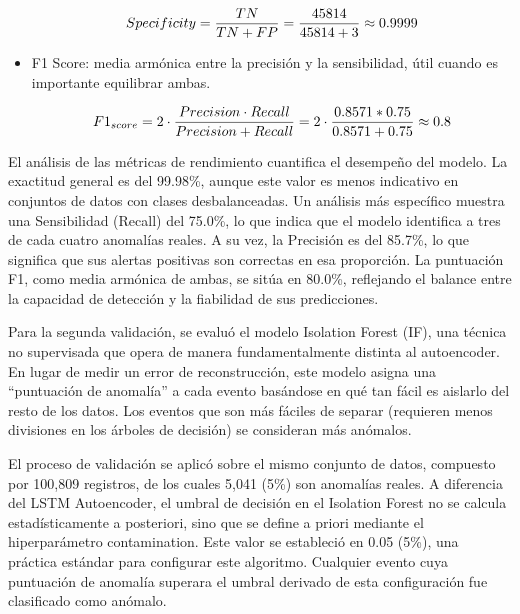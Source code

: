 \begin{itemize}
            \begin{align}
                  Specificity = \frac{TN}{TN+FP}=\frac{45814}{45814+3}\approx 0.9999 \notag \\
                  \label{eq:specificity}
            \end{align}

      \item F1 Score: media armónica entre la precisión y la sensibilidad, útil cuando es importante equilibrar ambas.

            \begin{align}
                  F1_{score} = 2 \cdot \frac{Precision \cdot Recall}{Precision + Recall} = 2 \cdot \frac{0.8571 * 0.75}{0.8571+0.75} \approx 0.8 \notag \\
                  \label{eq:f1score}
            \end{align}

\end{itemize}

El análisis de las métricas de rendimiento cuantifica el desempeño del modelo. La exactitud general es del 99.98\%, aunque este valor es menos indicativo en conjuntos de datos con clases desbalanceadas. Un análisis más específico muestra una Sensibilidad (Recall) del 75.0\%, lo que indica que el modelo identifica a tres de cada cuatro anomalías reales. A su vez, la Precisión es del 85.7\%, lo que significa que sus alertas positivas son correctas en esa proporción. La puntuación F1, como media armónica de ambas, se sitúa en 80.0\%, reflejando el balance entre la capacidad de detección y la fiabilidad de sus predicciones.


Para la segunda validación, se evaluó el modelo Isolation Forest (IF), una técnica no supervisada que opera de manera fundamentalmente distinta al autoencoder. En lugar de medir un error de reconstrucción, este modelo asigna una ``puntuación de anomalía'' a cada evento basándose en qué tan fácil es aislarlo del resto de los datos. Los eventos que son más fáciles de separar (requieren menos divisiones en los árboles de decisión) se consideran más anómalos.

El proceso de validación se aplicó sobre el mismo conjunto de datos, compuesto por 100,809 registros, de los cuales 5,041 (5\%) son anomalías reales. A diferencia del LSTM Autoencoder, el umbral de decisión en el Isolation Forest no se calcula estadísticamente a posteriori, sino que se define a priori mediante el hiperparámetro contamination. Este valor se estableció en 0.05 (5\%), una práctica estándar para configurar este algoritmo. Cualquier evento cuya puntuación de anomalía superara el umbral derivado de esta configuración fue clasificado como anómalo.

